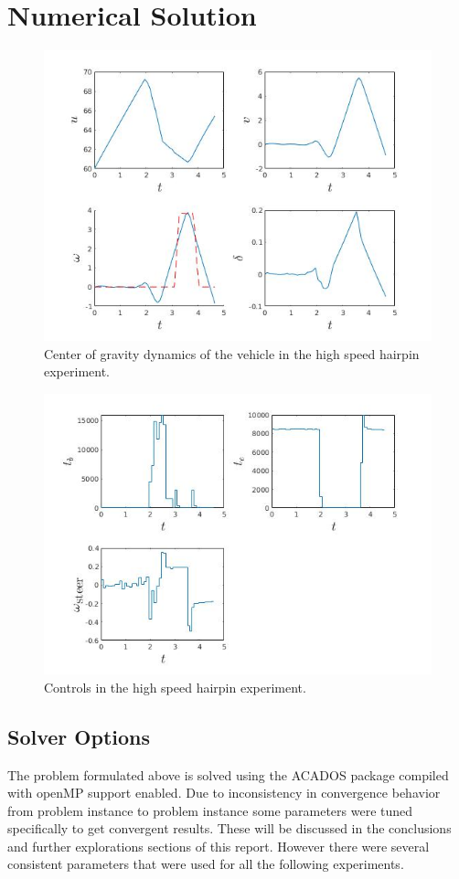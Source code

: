 \documentclass[conference,11pt]{IEEEtran}
\begin{document}
\section{Numerical Solution}
\begin{figure}[t]
  \centering
  \includegraphics[scale=0.5]{hairpin_brake_cg.jpg}
  \caption{Center of gravity dynamics of the vehicle in the high speed hairpin experiment.}
  \label{fig:hpcg0}
\end{figure}
\begin{figure}[b]
  \centering
  \includegraphics[scale=0.5]{hairpin_brake_u.jpg}
  \caption{Controls in the high speed hairpin experiment.}
  \label{fig:hpu0}
\end{figure}
\subsection{Solver Options}
The problem formulated above is solved using the ACADOS package compiled with openMP support enabled. Due to inconsistency in convergence behavior from problem instance to problem instance some
parameters were tuned specifically to get convergent results. These will be discussed in the conclusions and further explorations sections of this report. However there were several consistent
parameters that were used for all the following experiments.
\end{document}
